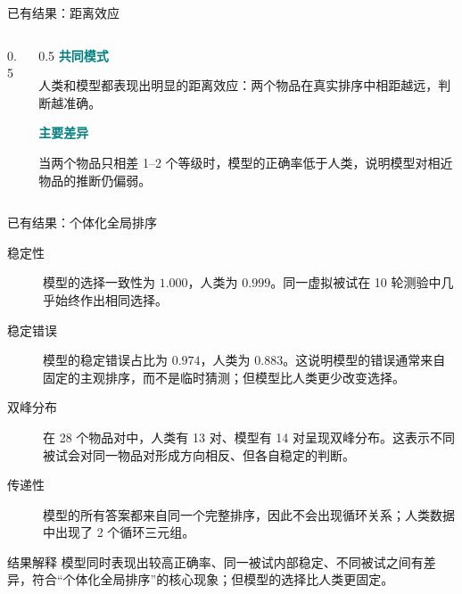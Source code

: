 \documentclass[aspectratio=169,11pt]{beamer}
\begin{document}
\begin{frame}{已有结果：距离效应}
  \begin{columns}[T,onlytextwidth]
    \begin{column}{0.5\textwidth}
      \centering
    \end{column}
    \begin{column}{0.5\textwidth}
      \small
      \textcolor{Teal}{\textbf{共同模式}}\par
      人类和模型都表现出明显的距离效应：两个物品在真实排序中相距越远，判断越准确。

      \vspace{1.2em}
      \textcolor{Teal}{\textbf{主要差异}}\par
      当两个物品只相差 1--2 个等级时，模型的正确率低于人类，说明模型对相近物品的推断仍偏弱。
    \end{column}
  \end{columns}
\end{frame}

\begin{frame}{已有结果：个体化全局排序}
  \small
  \begin{description}
    \item[稳定性]
      模型的选择一致性为 $1.000$，人类为 $0.999$。同一虚拟被试在 10 轮测验中几乎始终作出相同选择。

    \item[稳定错误]
      模型的稳定错误占比为 $0.974$，人类为 $0.883$。这说明模型的错误通常来自固定的主观排序，而不是临时猜测；但模型比人类更少改变选择。

    \item[双峰分布]
      在 28 个物品对中，人类有 13 对、模型有 14 对呈现双峰分布。这表示不同被试会对同一物品对形成方向相反、但各自稳定的判断。

    \item[传递性]
      模型的所有答案都来自同一个完整排序，因此不会出现循环关系；人类数据中出现了 2 个循环三元组。
  \end{description}

  \begin{alertblock}{结果解释}
    模型同时表现出较高正确率、同一被试内部稳定、不同被试之间有差异，符合“个体化全局排序”的核心现象；但模型的选择比人类更固定。
  \end{alertblock}
\end{frame}
\end{document}
